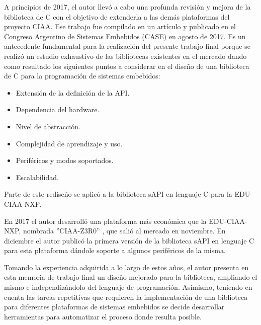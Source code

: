 A principios de 2017, el autor llevó a cabo una profunda revisión y mejora de la biblioteca de C con el objetivo de extenderla a las demás plataformas del proyecto CIAA.
Ese trabajo fue compilado en un artículo y publicado en el Congreso Argentino de Sistemas Embebidos (CASE) \citep{paperSapiCASE2017} en agosto de 2017. Es un antecedente fundamental para la realización del presente trabajo final porque se realizó un estudio exhaustivo de las bibliotecas existentes en el mercado dando como resultado los siguientes puntos a considerar en el diseño de una biblioteca de C para la programación de sistemas embebidos:

\begin{itemize}
\item
Extensión de la definición de la API.
\item
Dependencia del hardware.
\item
Nivel de abstracción.
\item
Complejidad de aprendizaje y uso.
\item
Periféricos y modos soportados.
\item
Escalabilidad.
\end{itemize}

Parte de este rediseño se aplicó a la biblioteca sAPI en lenguaje C para la EDU-CIAA-NXP.

En 2017 el autor desarrolló una plataforma más económica que la EDU-CIAA-NXP, nombrada ''CIAA-Z3R0'' \cite{CIAAZ3R0}, que salió al mercado en noviembre. En diciembre el autor publicó la primera versión de la biblioteca sAPI en lenguaje C para esta plataforma dándole soporte a algunos periféricos de la misma.

Tomando la experiencia adquirida a lo largo de estos años, el autor presenta en esta memoria de trabajo final un diseño mejorado para la biblioteca, ampliando el mismo e independizándolo del lenguaje de programación. Asimismo, teniendo en cuenta las tareas repetitivas que requieren la implementación de una biblioteca para diferentes plataformas de sistemas embebidos se decide desarrollar herramientas para automatizar el proceso donde resulta posible.

